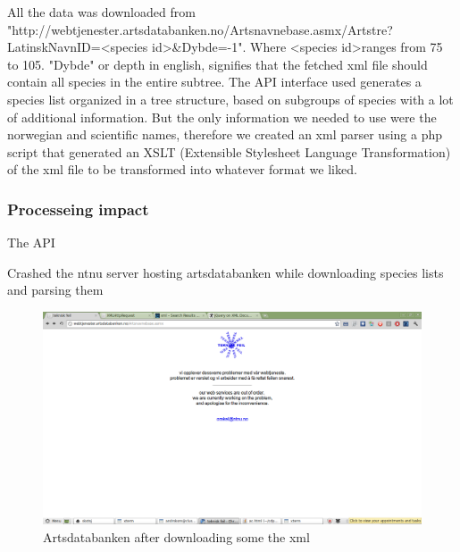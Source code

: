 	All the data was downloaded from
\newline"http://webtjenester.artsdatabanken.no/Artsnavnebase.asmx/Artstre? \newline LatinskNavnID=\textless species id\textgreater\&Dybde=-1".
	Where \textless species id\textgreater ranges from 75 to 105. "Dybde" or depth in english, signifies that the fetched xml file should contain all species in the entire subtree.
	The API interface used generates a species list organized in a tree structure, based on subgroups of species with a lot of additional information.
	But the only information we needed to use were the norwegian and scientific names, therefore we created an xml parser using a php script that generated an XSLT (Extensible Stylesheet Language Transformation\cite{w3:xslt}) of the xml file to be transformed into whatever format we liked.

	\subsubsection{Processeing impact}
	The API 

	Crashed the ntnu server hosting artsdatabanken while downloading species lists and parsing them

\begin{figure}[htb]
	\centering
	\includegraphics[width=1\textwidth]{implementation/preparation/ntnu_server_artsdatabanken.png}
	\caption{Artsdatabanken after downloading some the xml}
	\label{fig:artsdatabanken_api}
\end{figure}
